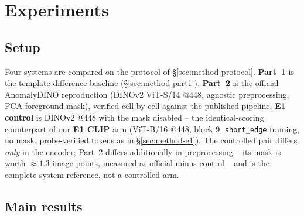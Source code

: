 \section{Experiments}
\label{sec:experiments}

\subsection{Setup}
\label{sec:exp-setup}

Four systems are compared on the protocol of \S\ref{sec:method-protocol}.
\textbf{Part~1} is the template-difference baseline (\S\ref{sec:method-part1}).
\textbf{Part~2} is the official AnomalyDINO reproduction (DINOv2 ViT-S/14 @448, agnostic
preprocessing, PCA foreground mask), verified cell-by-cell against the published pipeline.
\textbf{E1 control} is DINOv2 @448 with the mask disabled -- the identical-scoring
counterpart of our \textbf{E1 CLIP} arm (ViT-B/16 @448, block 9, \texttt{short\_edge}
framing, no mask, probe-verified tokens as in \S\ref{sec:method-e1}). The controlled pair
differs \emph{only} in the encoder; Part~2 differs additionally in preprocessing -- its mask
is worth ${\approx}1.3$ image points, measured as official minus control -- and is the
complete-system reference, not a controlled arm.

\subsection{Main results}
\label{sec:exp-main}

\begin{table}[t]
\centering
\caption{Image-level AUROC (\%), mean\,$\pm$\,std over three seeds of the six-category
means. The controlled pair is DINOv2-control vs CLIP; Part~2 adds the official PCA mask
(complete-system reference). Best per column in bold.}
\label{tab:image}
\footnotesize
\setlength{\tabcolsep}{2.2pt}
\end{table}

